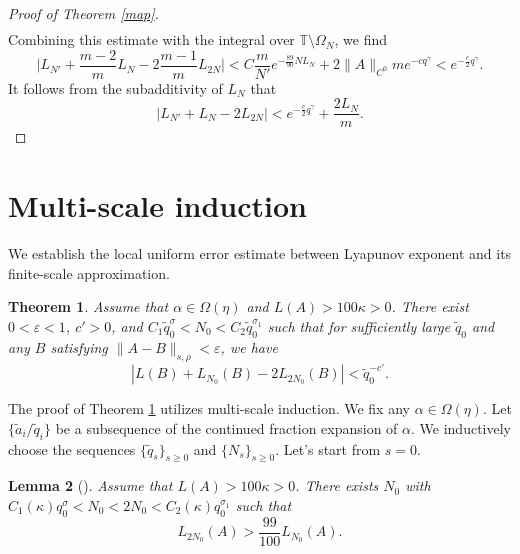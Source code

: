 \documentclass[reqno,12pt]{amsart}
\theoremstyle{plain}
\newtheorem{theorem}{Theorem}[section]
\newtheorem{lemma}[theorem]{Lemma}
\theoremstyle{definition}
\numberwithin{equation}{section}
\begin{document}
\begin{proof}[Proof of Theorem \ref{map}]
\begin{equation*}
\begin{split}
        \end{split}
    \end{equation*}
    Combining this estimate with the integral over $\mathbb{T} \setminus \Omega_{N}$, we find
    \begin{equation*}
        \bigg| L_{N'} + \frac{m-2}{m} L_{N} - 2\frac{m-1}{m} L_{2N} \bigg| < C \frac{m}{N'} e^{-\frac{89}{90}NL_{N}} +  2\|A\|_{C^{0}}m e^{-cq^{\gamma}} < e^{-\frac{c}{2}q^{\gamma}}.
    \end{equation*}
    It follows from the subadditivity of $L_{N}$ that
    \begin{equation*}
        |L_{N'} + L_{N} - 2L_{2N}| < e^{-\frac{c}{2}q^{\gamma}} + \frac{2L_{N}}{m}.
    \end{equation*}
\end{proof}



\section{Multi-scale induction}
We establish the local uniform error estimate between Lyapunov exponent and its finite-scale approximation.
\begin{theorem}\label{approx}
    Assume that $\alpha\in \Omega(\eta)$ and $L(A)>100\kappa>0$. There exist $0<\varepsilon<1$, $c'>0$, and $C_{1}\tilde{q}_{0}^{\sigma}<N_{0}<C_{2}\tilde{q}_{0}^{\sigma_{1}}$ such that for sufficiently large $\tilde{q}_{0}$ and any $B$ satisfying $\|A-B\|_{s,\rho}<\varepsilon$, we have
    \begin{equation*}
        |L(B)+L_{N_{0}}(B)-2L_{2N_{0}}(B)|< \tilde{q}_{0}^{-c'}.
    \end{equation*}
\end{theorem}

The proof of Theorem \ref{approx} utilizes multi-scale induction. We fix any $\alpha\in \Omega(\eta)$. 
Let $\{\tilde{a}_{i}/\tilde{q}_{i}\}$ be a subsequence of the continued fraction expansion of $\alpha$. We inductively choose the sequences $\{\tilde{q}_{s}\}_{s\geqslant 0}$ and $\{N_{s}\}_{s\geqslant
 0}$. Let's start from $s=0$. 

\begin{lemma}[\cite{MR4477429}]\label{first}
    Assume that $L(A)>100\kappa>0$. There exists $N_{0}$ with $C_{1}(\kappa)q_{0}^{\sigma}<N_{0}<2N_{0}<C_{2}(\kappa)q_{0}^{\sigma_{1}}$ such that
    \begin{equation*}
        L_{2N_{0}}(A)>\frac{99}{100}L_{N_{0}}(A).
    \end{equation*}
\end{lemma}
\end{document}
